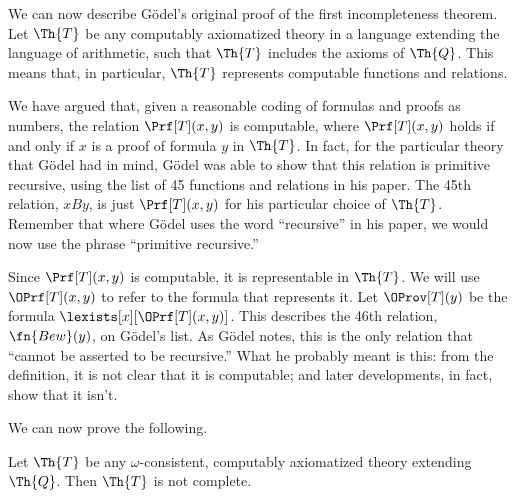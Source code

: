 \documentclass[../../include/open-logic-section]{subfiles}
\begin{document}


We can now describe G\"odel's original proof of the first
incompleteness theorem. Let $\Th{T}$ be any computably axiomatized theory
in a language extending the language of arithmetic, such that $\Th{T}$
includes the axioms of $\Th{Q}$. This means that, in particular, $\Th{T}$
represents computable functions and relations.

We have argued that, given a reasonable coding of formulas and proofs
as numbers, the relation $\Prf[T](x,y)$ is computable, where $\Prf[T](x,y)$
holds if and only if $x$ is a proof of formula $y$ in $\Th{T}$. In fact,
for the particular theory that G\"odel had in mind, G\"odel was able
to show that this relation is primitive recursive, using the list of
45 functions and relations in his paper. The 45th relation, $x B y$,
is just $\Prf[T](x,y)$ for his particular choice of $\Th{T}$. Remember that
where G\"odel uses the word ``recursive'' in his paper, we would now
use the phrase ``primitive recursive.''

Since $\Prf[T](x,y)$ is computable, it is representable in $\Th{T}$. We
will use $\OPrf[T](x,y)$ to refer to the formula that represents
it. Let $\OProv[T](y)$ be the formula
$\lexists[x][\OPrf[T](x,y)]$. This describes the 46th relation,
$\fn{Bew}(y)$, on G\"odel's list. As G\"odel notes, this is the only
relation that ``cannot be asserted to be recursive.''  What he
probably meant is this: from the definition, it is not clear that it
is computable; and later developments, in fact, show that it isn't.

We can now prove the following. 
\begin{thm}
Let $\Th{T}$ be any $\omega$-consistent, computably axiomatized theory
extending $\Th{Q}$. Then $\Th{T}$ is not complete.
\end{thm}
\end{document}
